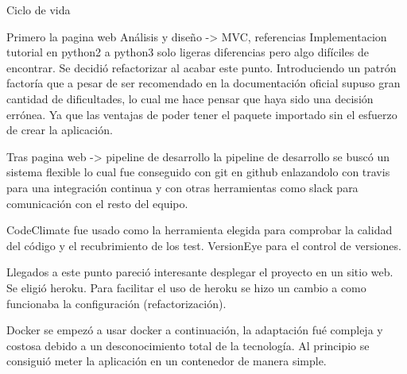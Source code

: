 




Ciclo de vida


Primero la pagina web
Análisis y diseño -> MVC, referencias 
Implementacion tutorial en python2 a python3 solo ligeras diferencias pero algo difíciles de encontrar.
Se decidió refactorizar al acabar este punto. Introduciendo un patrón factoría que a pesar de ser recomendado en la documentación oficial supuso gran cantidad de dificultades, lo cual me hace pensar que haya sido una decisión errónea. Ya que las ventajas de poder tener el paquete importado sin el esfuerzo de crear la aplicación.

Tras pagina web -> pipeline de desarrollo
la pipeline de desarrollo se buscó un sistema flexible lo cual fue conseguido con git en github enlazandolo con travis para una integración continua y con otras herramientas como slack para comunicación con el resto del equipo.

CodeClimate fue usado como la herramienta elegida para comprobar la calidad del código y el recubrimiento de los test. VersionEye para el control de versiones.


Llegados a este punto pareció interesante desplegar el proyecto en un sitio web. Se eligió heroku. Para facilitar el uso de heroku se hizo un cambio a como funcionaba la configuración (refactorización). 

Docker se empezó a usar docker a continuación, la adaptación fué compleja y costosa debido a un desconocimiento total de la tecnología. Al principio se consiguió meter la aplicación en un contenedor de manera simple.








